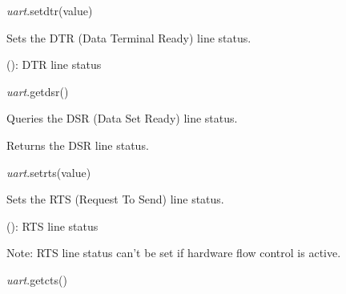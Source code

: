 \documentclass[a4paper,12pt,twoside,extrafontsizes]{memoir}
\begin{document}

\begin{luafuncprototype}
\emph{uart}.setdtr(value)
\end{luafuncprototype}

\begin{funcdescr}
	Sets the DTR (Data Terminal Ready) line status.
\end{funcdescr}

\begin{funcparams}
	 (): DTR line status
\end{funcparams}


\begin{luafuncprototype}
\emph{uart}.getdsr()
\end{luafuncprototype}

\begin{funcdescr}
	Queries the DSR (Data Set Ready) line status.
\end{funcdescr}

\begin{funcret}
	Returns the DSR line status.
\end{funcret}


\begin{luafuncprototype}
\emph{uart}.setrts(value)
\end{luafuncprototype}

\begin{funcdescr}
	Sets the RTS (Request To Send) line status.
\end{funcdescr}

\begin{funcparams}
	 (): RTS line status
\end{funcparams}

\begin{funcremarks}
	Note: RTS line status can't be set if hardware flow control is active.
\end{funcremarks}


\begin{luafuncprototype}
\emph{uart}.getcts()
\end{luafuncprototype}
\end{document}
